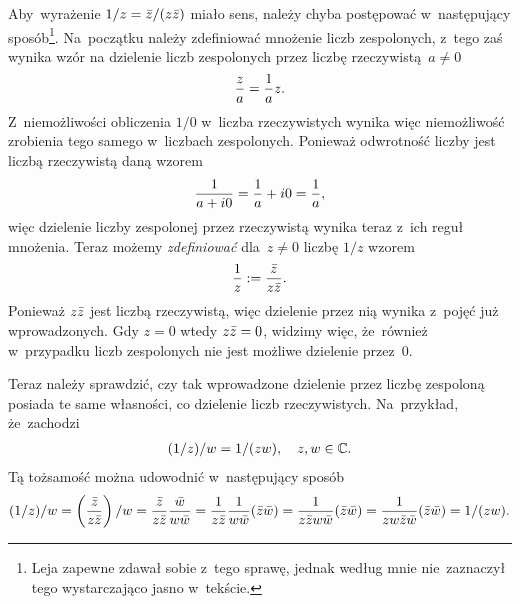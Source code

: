 \documentclass[a4paper,11pt]{article}
\begin{document}
\start {} Aby~wyrażenie $1 / z = \bar{ z } / ( z \bar{ z } )$ miało
sens, należy chyba postępować w~następujący sposób\footnote{Leja
  zapewne zdawał sobie z~tego sprawę, jednak według mnie nie~zaznaczył
  tego wystarczająco jasno w~tekście.}. Na~początku należy zdefiniować
mnożenie liczb zespolonych, z~tego zaś wynika wzór na dzielenie liczb
zespolonych przez liczbę rzeczywistą~$a \neq 0$
\begin{equation}
  \label{eq:Leja-01}
  \begin{split}
    \frac{ z }{ a } = \frac{ 1 }{  a  } z.
  \end{split}
\end{equation}
Z~niemożliwości obliczenia $1 / 0$ w~liczba rzeczywistych wynika więc
niemożliwość zrobienia tego samego w~liczbach zespolonych. Ponieważ
odwrotność liczby jest liczbą rzeczywistą daną wzorem
\begin{equation}
  \label{eq:Leja-02}
  \begin{split}
    \frac{ 1 }{  a + i0  } = \frac{ 1 }{  a  } + i0 = \frac{ 1 }{  a  },
  \end{split}
\end{equation}
więc dzielenie liczby zespolonej przez rzeczywistą wynika teraz z~ich
reguł mnożenia. Teraz możemy \emph{zdefiniować} dla~$z \neq 0$ liczbę
$1 / z$ wzorem
\begin{equation}
  \label{eq:Leja-03}
  \begin{split}
    \frac{ 1 }{  z  } := \frac{ \bar{ z } }{ z \bar{ z } }.
  \end{split}
\end{equation}
Ponieważ $z \bar{ z }$ jest liczbą rzeczywistą, więc dzielenie przez nią
wynika z~pojęć już wprowadzonych. Gdy $z = 0$ wtedy $z \bar{ z } = 0$,
widzimy więc, że~również w~przypadku liczb zespolonych nie jest
możliwe dzielenie przez~0.

Teraz należy sprawdzić, czy tak wprowadzone dzielenie przez liczbę
zespoloną posiada te same własności, co dzielenie liczb rzeczywistych.
Na~przykład, że~zachodzi
\begin{equation}
  \label{eq:Leja-04}
  \begin{split}
    ( 1 / z ) / w = 1 / ( z w ), \quad z, w \in \mathbb{C}.
  \end{split}
\end{equation}
Tą tożsamość można udowodnić w~następujący sposób
\begin{equation}
  \label{eq:Leja-05}
  \begin{split}
    ( 1 / z ) / w = \left( \frac{ \bar{ z } }{ z \bar{ z } } \right) / w = \frac{
      \bar{ z } }{ z \bar{ z } } \frac{ \bar{ w } }{ w \bar{ w } } = \frac{ 1 }{  z \bar{ z }  }
    \frac{ 1 }{  w \bar{ w }  } ( \bar{ z } \bar{ w } ) = \frac{ 1 }{  z \bar{ z } w \bar{ w }  } (
    \bar{ z } \bar{ w } ) = \frac{ 1 }{  z w \bar{ z } \bar{ w }  } ( \bar{ z } \bar{ w } ) = 1 / (
    z w ).
  \end{split}
\end{equation}
\end{document}
